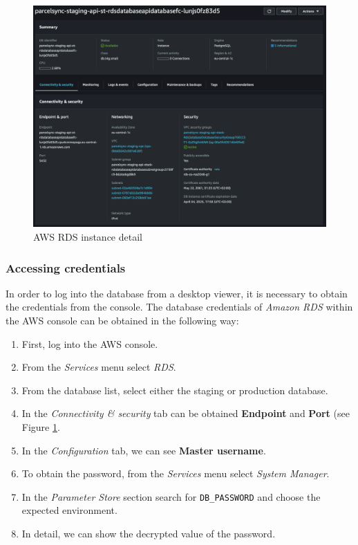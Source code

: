 \begin{figure}[p]\centering
\includegraphics[width=140mm]{img/docs/fig_aws_rds.png}
\caption{AWS RDS instance detail}
\label{img:admin-manual-aws.rds.detail}
\end{figure}

\subsubsection{Accessing credentials}
In order to log into the database from a desktop viewer, it is necessary to obtain the credentials from the console. 
The database credentials of \textit{Amazon RDS} within the AWS console can be obtained in the following way:
\begin{enumerate}
    \item First, log into the AWS console.
    \item From the \textit{Services} menu select \textit{RDS}.
    \item From the database list, select either the staging or production database.
    \item In the \textit{Connectivity \& security} tab can be obtained \textbf{Endpoint} and \textbf{Port} (see Figure \ref{img:admin-manual-aws.rds.detail}.
    \item In the \textit{Configuration} tab, we can see \textbf{Master username}.
    \item To obtain the password, from the \textit{Services} menu select \textit{System Manager}.
    \item In the \textit{Parameter Store} section search for \texttt{DB\_PASSWORD} and choose the expected environment.
    \item In detail, we can show the decrypted value of the password.
\end{enumerate}

